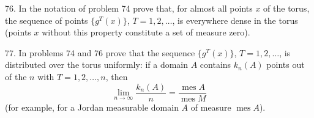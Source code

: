 \begin{problem}{76.}
	In the notation of problem 74 prove that, for almost all points $x$ of the torus,
	the sequence of points $\{g^T (x)\}$, $T=1, 2, \dotsc$, is everywhere dense in the torus
	(points $x$ without this property constitute a set of measure zero).
\end{problem}

\begin{problem}{77.}
	In problems 74 and 76 prove that the sequence $\{g^T (x)\}$, $T=1, 2, \dotsc$, is distributed
	over the torus uniformly: if a domain $A$ contains $k_n(A)$ points out of the $n$ with $T=1, 2, \dotsc,n$, then
	\begin{equation*}
	\lim_{n \to \infty} \frac{k_n(A)}{n}=\frac{\operatorname{mes} A}{\operatorname{mes} M}
	\end{equation*}
	(for example, for a Jordan measurable domain $A$ of measure $\operatorname{mes} A$).
\end{problem}

